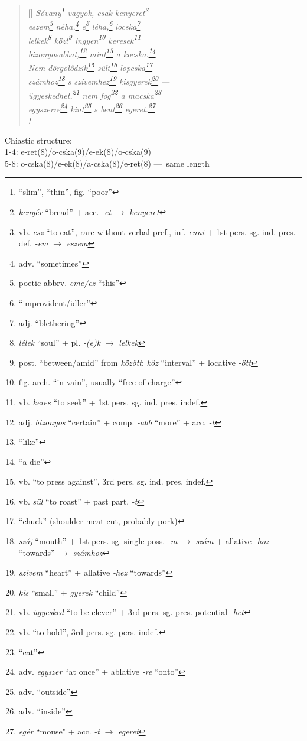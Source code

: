 \documentclass[a4paper,12pt,twoside,final]{book}
\begin{document}
\begin{verse}[\versewidth]
  \it
  Sóvany\footnote{``slim'', ``thin'', fig. ``poor''} vagyok, csak
  kenyeret\footnote{\emph{kenyér} ``bread'' + acc. \emph{-et}
  $\rightarrow$ \emph{kenyeret}} \\
  eszem\footnote{vb. \emph{esz} ``to eat'', rare without verbal
  pref., inf. \emph{enni} + 1st pers. sg. ind. pres. def. \emph{-em}
  $\rightarrow$ \emph{eszem}} néha,\footnote{adv. ``sometimes''} e\footnote{poetic
  abbrv. \emph{eme/ez} ``this''} léha,\footnote{``improvident/idler''}
  locska\footnote{adj. ``blethering''} \\
  lelkek\footnote{\emph{lélek} ``soul'' +
  pl. \emph{-(e)k} $\rightarrow$ \emph{lelkek}}
  közt\footnote{post. ``between/amid'' from \emph{között}: \emph{köz}
  ``interval'' + locative \emph{-ött}} ingyen\footnote{fig. arch. ``in
  vain'', usually ``free of charge''} keresek\footnote{vb.
  \emph{keres} ``to seek'' + 1st pers. sg. ind. pres. indef.} \\
  bizonyosabbat,\footnote{adj. \emph{bizonyos} ``certain'' +
  comp. \emph{-abb} ``more'' + acc. \emph{-t}} mint\footnote{``like''} a
  kocska.\footnote{``a die''} \\
  Nem dörgölődzik\footnote{vb. ``to press against'', 3rd
  pers. sg. ind. pres. indef.} sült\footnote{vb. \emph{sül} ``to
  roast''  + past part. \emph{-t}} lopcska\footnote{``chuck''
  (shoulder meat cut, probably pork)} \\
  számhoz\footnote{\emph{száj} ``mouth'' + 1st
  pers. sg. single poss. \emph{-m} $\rightarrow$ \emph{szám} +
  allative \emph{-hoz} ``towards'' $\rightarrow$ \emph{számhoz}} s
  szivemhez\footnote{\emph{szivem} ``heart'' +
  allative \emph{-hez} ``towards''} kisgyerek\footnote{\emph{kis} ``small'' +
  \emph{gyerek} ``child''} --- \\
  ügyeskedhet,\footnote{vb. \emph{ügyesked} ``to be clever'' +
  3rd pers. sg. pres. potential \emph{-het}} nem fog\footnote{vb.
  ``to hold'', 3rd pers. sg. pers. indef.} a macska\footnote{``cat''} \\
  egyszerre\footnote{adv. \emph{egyszer} ``at once'' +
  ablative \emph{-re} ``onto''} kint\footnote{adv. ``outside''} s
  bent\footnote{adv. ``inside''} egeret.\footnote{\emph{egér}
  ``mouse" + acc. \emph{-t} $\rightarrow$ \emph{egeret}} \\!
\end{verse}

\noindent Chiastic structure: \\
1-4: e-ret(8)/o-cska(9)/e-ek(8)/o-cska(9) \\
5-8: o-cska(8)/e-ek(8)/a-cska(8)/e-ret(8) ---~same length
\end{document}
